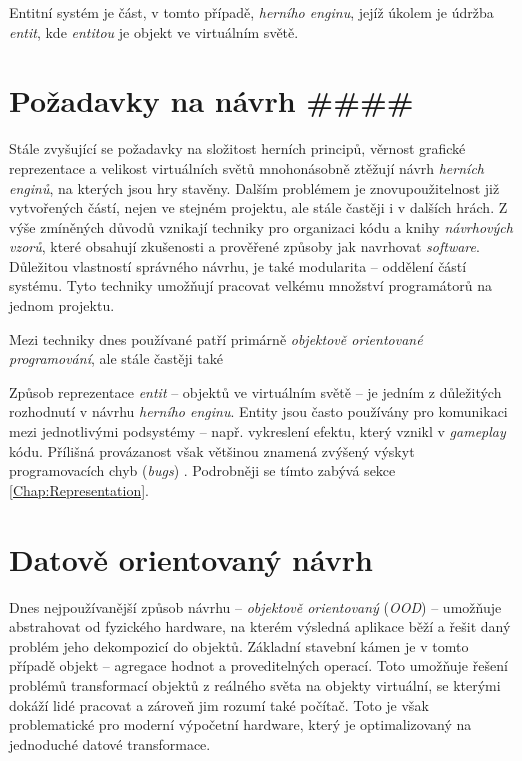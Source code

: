 Entitní systém je část, v tomto případě, \emph{herního enginu}, jejíž úkolem je údržba \emph{entit}, kde \emph{entitou} je objekt ve virtuálním světě. 

\blind[3]

\section{Požadavky na návrh ####}
\blind[2]

Stále zvyšující se požadavky na složitost herních principů, věrnost grafické reprezentace a velikost virtuálních světů mnohonásobně ztěžují návrh \emph{herních enginů}, na kterých jsou hry stavěny. Dalším problémem je znovupoužitelnost již vytvořených částí, nejen ve stejném projektu, ale stále častěji i v dalších hrách. Z výše zmíněných důvodů vznikají techniky pro organizaci kódu a knihy \emph{návrhových vzorů}\cite{DesignPatterns}\cite{GameDesignPatterns}, které obsahují zkušenosti a prověřené způsoby jak navrhovat \emph{software}. Důležitou vlastností správného návrhu, je také modularita -- oddělení částí systému. Tyto techniky umožňují pracovat velkému množství programátorů na jednom projektu.

Mezi techniky dnes používané patří primárně \emph{objektově orientované programování}, ale stále častěji také \emph{}

Způsob reprezentace \emph{entit} -- objektů ve virtuálním světě -- je jedním z důležitých rozhodnutí v návrhu \emph{herního enginu}. Entity jsou často používány pro komunikaci mezi jednotlivými podsystémy -- např. vykreslení efektu, který vznikl v \emph{gameplay} kódu. Přílišná provázanost však většinou znamená zvýšený výskyt programovacích chyb (\emph{bugs}) \cite{GameDesignPatterns}. Podrobněji se tímto zabývá sekce \ref{Chap:Representation}.

\section{Datově orientovaný návrh}
\label{Chap:DDD}

Dnes nejpoužívanější způsob návrhu -- \emph{objektově orientovaný} (\emph{OOD}) -- umožňuje abstrahovat od fyzického hardware, na kterém výsledná aplikace běží a řešit daný problém jeho dekompozicí do objektů. Základní stavební kámen je v tomto případě objekt -- agregace hodnot a proveditelných operací. Toto umožňuje řešení problémů transformací objektů z reálného světa na objekty virtuální, se kterými dokáží lidé pracovat a zároveň jim rozumí také počítač. Toto je však problematické pro moderní výpočetní hardware, který je optimalizovaný na jednoduché datové transformace.

